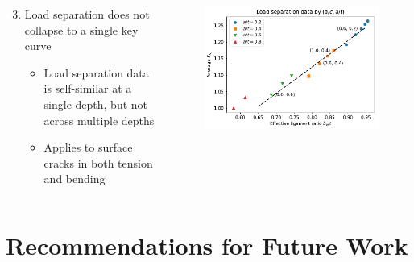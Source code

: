 \begin{frame}
\begin{columns}
\begin{column}{0.45\textwidth}
\begin{enumerate}\setcounter{enumi}{2}
\item Load separation does not collapse to a single key curve
\begin{itemize}
\item Load separation data is self-similar at a single depth, but not across multiple depths
\item Applies to surface cracks in both tension and bending
\end{itemize}
\end{enumerate}
\end{column}
\begin{column}{0.45\textwidth}
\begin{figure}[tbp]
\centering
\includegraphics[width=\columnwidth]{bet_Sij_tension_14_annotated}
\end{figure}
\end{column}
\end{columns}
\end{frame}

\section{Recommendations for Future Work}

